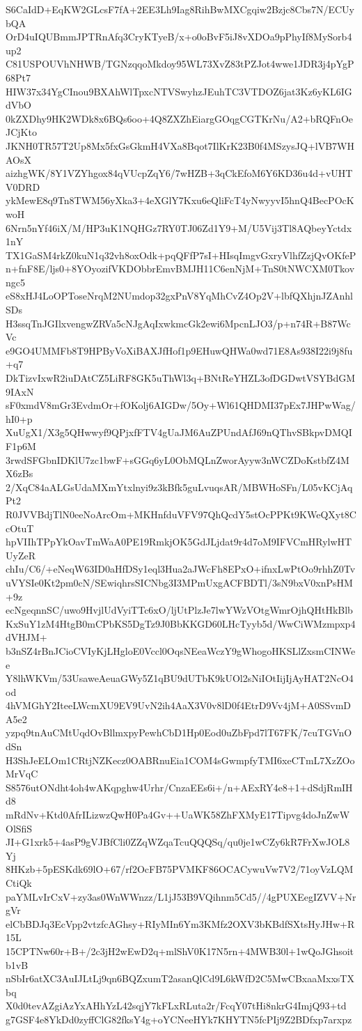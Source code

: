 S6CaIdD+EqKW2GLcsF7fA+2EE3Lh9Iag8RihBwMXCgqiw2Bzjc8Cbs7N/ECUybQA
OrD4uIQUBmmJPTRnAfq3CryKTyeB/x+o0oBvF5iJ8vXDOa9pPhyIf8MySorb4up2
C81USPOUVhNHWB/TGNzqqoMkdoy95WL73XvZ83tPZJot4wwe1JDR3j4pYgP68Pt7
HIW37x34YgCInou9BXAhWlTpxcNTVSwyhzJEuhTC3VTDOZ6jat3Kz6yKL6IGdVbO
0kZXDhy9HK2WDk8x6BQs6oo+4Q8ZXZhEiargGOqgCGTKrNu/A2+bRQFnOeJCjKto
JKNH0TR57T2Up8Mx5fxGsGkmH4VXa8Bqot7IlKrK23B0f4MSzysJQ+lVB7WHAOsX
aizhgWK/8Y1VZYhgox84qVUcpZqY6/7wHZB+3qCkEfoM6Y6KD36u4d+vUHTV0DRD
ykMewE8q9Tn8TWM56yXka3+4eXGlY7Kxu6eQliFcT4yNwyyvI5hnQ4BecPOcKwoH
6Nrn5nYf46iX/M/HP3uK1NQHGz7RY0TJ06Zd1Y9+M/U5Vij3Tl8AQbeyYctdx1nY
TX1GaSM4rkZ0kuN1q32vh8oxOdk+pqQFfP7sI+HIsqImgvGxryVlhfZzjQvOKfeP
n+fnF8E/ljs0+8YOyozifVKDObbrEmvBMJH11C6enNjM+TnS0tNWCXM0Tkovngc5
eS8xHJ4LoOPToseNrqM2NUmdop32gxPnV8YqMhCvZ4Op2V+lbfQXhjnJZAnhlSDs
H3ssqTnJGIlxvengwZRVa5cNJgAqIxwkmcGk2ewi6MpcnLJO3/p+n74R+B87WcVc
e9GO4UMMFb8T9HPByVoXiBAXJfHof1p9EHuwQHWa0wd71E8As938I22i9j8fu+q7
DkTizvIxwR2iuDAtCZ5LiRF8GK5uThWl3q+BNtReYHZL3ofDGDwtVSYBdGM9IAxN
sF0xmdV8mGr3EvdmOr+fOKolj6AIGDw/5Oy+Wl61QHDMI37pEx7JHPwWag/hI0+p
XuUgX1/X3g5QHwwyf9QPjxfFTV4gUaJM6AuZPUndAfJ69nQThvSBkpvDMQIF1p6M
3rwdSFGbnIDKlU7zc1bwF+sGGq6yL0ObMQLnZworAyyw3nWCZDoKstbfZ4MX6zBs
2/XqC84aALGsUdaMXmYtxlnyi9z3kBfk5guLvuqsAR/MBWHoSFn/L05vKCjAqPt2
R0JVVBdjTlN0eeNoArcOm+MKHnfduVFV97QhQcdY5stOcPPKt9KWeQXyt8CcOtuT
hpVIIhTPpYkOavTmWaA0PE19RmkjOK5GdJLjdat9r4d7oM9IFVCmHRylwHTUyZeR
chIu/C6/+eNeqW63ID0aHfDSy1eql3Hua2aJWcFh8EPxO+ifnxLwPtOo9rhhZ0Tv
uVYSIe0Kt2pm0cN/SEwiqhrsSICNbg3I3MPmUxgACFBDTl/3sN9bxV0xnPsHM+9z
ecNgeqnnSC/uwo9HvjlUdVyiTTc6xO/ljUtPlzJe7lwYWzVOtgWmrOjhQHtHkBlb
KxSuY1zM4HtgB0mCPbKS5DgTz9J0BbKKGD60LHcTyyb5d/WwCiWMzmpxp4dVHJM+
b3nSZ4rBnJCioCVIyKjLHgloE0Vccl0OqsNEeaWczY9gWhogoHKSLlZxsmCINWee
Y8lhWKVm/53UsaweAeuaGWy5Z1qBU9dUTbK9kUOl2sNiIOtIijIjAyHAT2NcO4od
4hVMGhY2IteeLWcmXU9EV9UvN2ih4AaX3V0v8lD0f4EtrD9Vv4jM+A0SSvmDA5e2
yzpq9tnAuCMtUqdOvBllmxpyPewhCbD1Hp0Eod0uZbFpd7lT67FK/7cuTGVnOdSn
H3ShJeELOm1CRtjNZKecz0OABRnuEia1COM4sGwmpfyTMI6xeCTmL7XzZOoMrVqC
S8576utONdht4oh4wAKqpghw4Urhr/CnzaEEs6i+/n+AExRY4e8+1+dSdjRmIHd8
mRdNv+Ktd0AfrILizwzQwH0Pa4Gv++UaWK58ZhFXMyE17Tipvg4doJnZwWOlSfiS
JI+G1xrk5+4asP9gVJBfCli0ZZqWZqaTcuQQQSq/qu0je1wCZy6kR7FrXwJOL8Yj
8HKzb+5pESKdk69lO+67/rf2OcFB75PVMKF86OCACywuVw7V2/71oyVzLQMCtiQk
paYMLvIrCxV+zy3as0WnWWnzz/L1jJ53B9VQihnm5Cd5//4gPUXEegIZVV+NrgVr
elCbBDJq3EcVpp2vtzfcAGhsy+RIyMIn6Ym3KMfz2OXV3bKBdfSXtsHyJHw+R15L
15CPTNw60r+B+/2c3jH2wEwD2q+mlShV0K17N5rn+4MWB30l+1wQoJGhsoitb1vB
nSbIr6atXC3AuIJLtLj9qn6BQZxumT2asanQlCd9L6kWfD2C5MwCBxaaMxxsTXbq
X0d0tevAZgiAzYxAHhYzL42sqjY7kFLxRLuta2r/FcqY07tHi8nkrG4ImjQ93+td
g7GSF4e8YkDd0zyffClG82fksY4g+oYCNeeHYk7KHYTN5fcPIj9Z2BDfxp7arxpz
